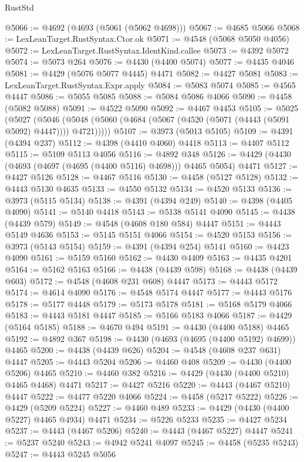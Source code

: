 \begin{lexlean}{RustStd}
\begin{coremodule}
{\begin{coremodule}
{{{{{{{{{{{{{{{{{{{{{{{{{{{{{{{{{{{{{{{{{{{{{{{{{{{{{{{{{{{{{{{{{{{{@5066 := @4692 (@4693 (@5061 (@5062 @4698)))
@5067 := @4685 @5066
@5068 := LexLeanTarget.RustSyntax.Ctor.ok
@5071 := @4548 (@5068 @5050 @4056)
@5072 := LexLeanTarget.RustSyntax.IdentKind.callee
@5073 := @4392 @5072
@5074 := @5073 @264
@5076 := @4430 (@4400 @5074)
@5077 := @4435 @4046
@5081 := @4429 (@5076 @5077 @4445) @4471
@5082 := @4427 @5081
@5083 := LexLeanTarget.RustSyntax.Expr.apply
@5084 := @5083 @5074
@5085 := @4565 @4447
@5086 := @5055 @5085
@5088 := @5084 @5086 @4066
@5090 := @4458 (@5082 @5088)
@5091 := @4522 @5090
@5092 := @4467 @4453
@5105 := @5025
    (@5027
      (@5046 (@5048 (@5060 (@4684 (@5067 (@4520 (@5071 (@4443 (@5091 @5092) @4447)))) @4721)))))
@5107 := @3973 (@5013 @5105)
@5109 := @4391 (@4394 @237)
@5112 := @4398 (@4410 @4060) @4418
@5113 := @4407 @5112
@5115 := @5109 @5113 @4056
@5116 := @4892 @348
@5126 := @4429 (@4430 (@4693 (@4697 (@4695 (@4400 @5116) @4698))) @4465 @5054) @4471
@5127 := @4427 @5126
@5128 := @4467 @5116
@5130 := @4458 (@5127 @5128)
@5132 := @4443 @5130 @4635
@5133 := @4550 @5132
@5134 := @4520 @5133
@5136 := @3973 (@5115 @5134)
@5138 := @4391 (@4394 @249)
@5140 := @4398 (@4405 @4090)
@5141 := @5140 @4418
@5143 := @5138 @5141 @4090
@5145 := @4438 (@4439 @579)
@5149 := @4548 (@4608 @180 @584) @4447
@5151 := @4443 @5149 @4636
@5153 := @5145 @5151 @4066
@5154 := @4520 @5153
@5156 := @3973 (@5143 @5154)
@5159 := @4391 (@4394 @254) @5141
@5160 := @4423 @4090
@5161 := @5159 @5160
@5162 := @4430 @4409
@5163 := @4435 @4201
@5164 := @5162 @5163
@5166 := @4438 (@4439 @598)
@5168 := @4438 (@4439 @603)
@5172 := @4548 (@4608 @231 @608) @4447
@5173 := @4443 @5172
@5174 := @4614 @4090
@5176 := @4548 @5174 @4447
@5177 := @4443 @5176
@5178 := @5177 @4448
@5179 := @5173 @5178
@5181 := @5168 @5179 @4066
@5183 := @4443 @5181 @4447
@5185 := @5166 @5183 @4066
@5187 := @4429 (@5164 @5185)
@5188 := @4670 @494
@5191 := @4430 (@4400 @5188) @4465
@5192 := @4892 @367
@5198 := @4430 (@4693 (@4695 (@4400 @5192) @4699)) @4465
@5200 := @4438 (@4439 @626)
@5204 := @4548 (@4608 @237 @631) @4447
@5205 := @4443 @5204
@5206 := @4460 @408
@5209 := @4430 (@4400 @5206) @4465
@5210 := @4460 @382
@5216 := @4429 (@4430 (@4400 @5210) @4465 @4468) @4471
@5217 := @4427 @5216
@5220 := @4443 (@4467 @5210) @4447
@5222 := @4477 @5220 @4066
@5224 := @4458 (@5217 @5222)
@5226 := @4429 (@5209 @5224)
@5227 := @4460 @489
@5233 := @4429 (@4430 (@4400 @5227) @4465 @4934) @4471
@5234 := @5226 @5233
@5235 := @4427 @5234
@5237 := @4443 (@4467 @5206)
@5240 := @4443 (@4467 @5227) @4447
@5241 := @5237 @5240
@5243 := @4942 @5241 @4097
@5245 := @4458 (@5235 @5243)
@5247 := @4443 @5245 @5056
}}}}}}}}}}}}}}}}}}}}}}}}}}}}}}}}}}}}}}}}}}}}}}}}}}}}}}}}}}}}}}}}}}}}
\end{coremodule}}
\end{coremodule}
\end{lexlean}
